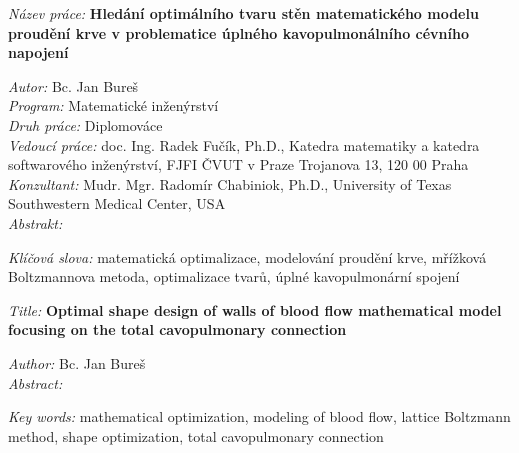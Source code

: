
%
\begin{onehalfspace}
\noindent \emph{Název práce:}
\noindent \textbf{Hledání optimálního tvaru stěn matematického modelu proudění krve v problematice úplného kavopulmonálního cévního napojení}
\end{onehalfspace}
\noindent \emph{Autor:} Bc. Jan Bureš\\[2pt]
\noindent \emph{Program:} Matematické inženýrství\\[2pt]
\noindent \emph{Druh práce:} Diplomováce\\[2pt]
\noindent \emph{Vedoucí práce:} doc. Ing. Radek Fučík, Ph.D.,
Katedra matematiky a katedra softwarového inženýrství, FJFI ČVUT v Praze
Trojanova 13, 120 00 Praha\\[2pt]
\noindent \emph{Konzultant:} Mudr. Mgr. Radomír Chabiniok, Ph.D., University of Texas Southwestern Medical Center, USA\\[2pt]
\noindent \emph{Abstrakt:} \lipsum[1]\lipsum[2]

\bigskip{}

\noindent \emph{Klíčová slova:} matematická optimalizace, modelování proudění krve, mřížková Boltzmannova metoda, optimalizace tvarů, úplné kavopulmonární spojení
\vfill{}
~

%
\begin{onehalfspace}
\noindent \emph{Title:}
\noindent \textbf{Optimal shape design of walls of blood flow mathematical model focusing on the total cavopulmonary connection}
\end{onehalfspace}
\noindent \emph{Author:} Bc. Jan Bureš\\[2pt]
\noindent \emph{Abstract:} \lipsum[1]

\bigskip{}

\noindent \emph{Key words:} mathematical optimization, modeling of blood flow, lattice Boltzmann method, shape optimization, total cavopulmonary connection
